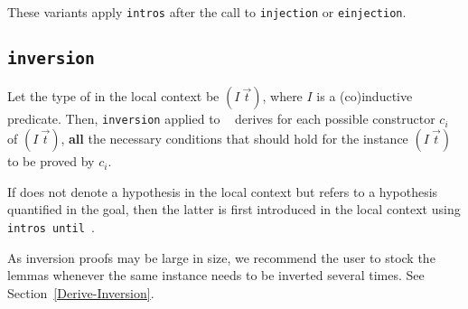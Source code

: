 \begin{coq_example*}
\begin{Variants}
These variants apply \texttt{intros} \nelist{\intropattern}{} after
the call to \texttt{injection} or \texttt{einjection}.

\end{Variants}

\subsection{\tt inversion \ident}

Let the type of {\ident} in the local context be $(I~\vec{t})$,
where $I$ is a (co)inductive predicate. Then,
\texttt{inversion} applied to \ident~ derives for each possible
constructor $c_i$ of $(I~\vec{t})$, {\bf all} the necessary
conditions that should hold for the instance $(I~\vec{t})$ to be
proved by $c_i$.

\Rem If {\ident} does not denote a hypothesis in the local context
but refers to a hypothesis quantified in the goal, then the
latter is first introduced in the local context using
\texttt{intros until \ident}.

\Rem As inversion proofs may be large in size, we recommend the user to
stock the lemmas whenever the same instance needs to be inverted
several times. See Section~\ref{Derive-Inversion}.

\end{coq_example*}
